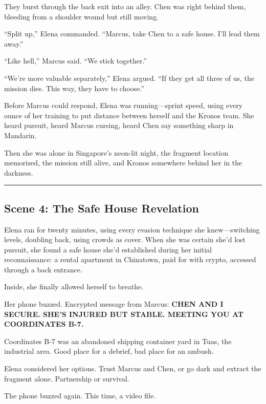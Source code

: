 They burst through the back exit into an alley. Chen was right behind
them, bleeding from a shoulder wound but still moving.

``Split up,'' Elena commanded. ``Marcus, take Chen to a safe house. I'll
lead them away.''

``Like hell,'' Marcus said. ``We stick together.''

``We're more valuable separately,'' Elena argued. ``If they get all
three of us, the mission dies. This way, they have to choose.''

Before Marcus could respond, Elena was running---sprint speed, using
every ounce of her training to put distance between herself and the
Kronos team. She heard pursuit, heard Marcus cursing, heard Chen say
something sharp in Mandarin.

Then she was alone in Singapore's neon-lit night, the fragment location
memorized, the mission still alive, and Kronos somewhere behind her in
the darkness.

\begin{center}\rule{0.5\linewidth}{0.5pt}\end{center}

\hypertarget{scene-4-the-safe-house-revelation}{%
\subsection{Scene 4: The Safe House
Revelation}\label{scene-4-the-safe-house-revelation}}

Elena ran for twenty minutes, using every evasion technique she
knew---switching levels, doubling back, using crowds as cover. When she
was certain she'd lost pursuit, she found a safe house she'd established
during her initial reconnaissance: a rental apartment in Chinatown, paid
for with crypto, accessed through a back entrance.

Inside, she finally allowed herself to breathe.

Her phone buzzed. Encrypted message from Marcus: \textbf{CHEN AND I
SECURE. SHE'S INJURED BUT STABLE. MEETING YOU AT COORDINATES B-7.}

Coordinates B-7 was an abandoned shipping container yard in Tuas, the
industrial area. Good place for a debrief, bad place for an ambush.

Elena considered her options. Trust Marcus and Chen, or go dark and
extract the fragment alone. Partnership or survival.

The phone buzzed again. This time, a video file.

